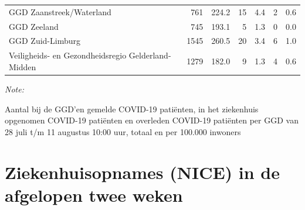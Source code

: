 \documentclass[
  english,
  man,floatsintext]{apa6}
\begin{document}
\begin{table}
\begin{threeparttable}
\begin{tabular}{lrrrrrr}
GGD Zaanstreek/Waterland & 761 & 224.2 & 15 & 4.4 & 2 & 0.6\\
GGD Zeeland & 745 & 193.1 & 5 & 1.3 & 0 & 0.0\\
GGD Zuid-Limburg & 1545 & 260.5 & 20 & 3.4 & 6 & 1.0\\
Veiligheids- en Gezondheidsregio Gelderland-Midden & 1279 & 182.0 & 9 & 1.3 & 4 & 0.6\\
\bottomrule
\end{tabular}
\begin{tablenotes}
\item \textit{Note: } 
\item Aantal bij de GGD’en gemelde COVID-19 patiënten, in het ziekenhuis opgenomen COVID-19 patiënten en overleden COVID-19 patiënten per GGD van 28 juli t/m 11 augustus 10:00 uur, totaal en per 100.000 inwoners
\end{tablenotes}
\end{threeparttable}
\endgroup{}
\end{table}

\newpage

\hypertarget{ziekenhuisopnames-nice-in-de-afgelopen-twee-weken}{%
\section{Ziekenhuisopnames (NICE) in de afgelopen twee weken}\label{ziekenhuisopnames-nice-in-de-afgelopen-twee-weken}}
\end{document}
